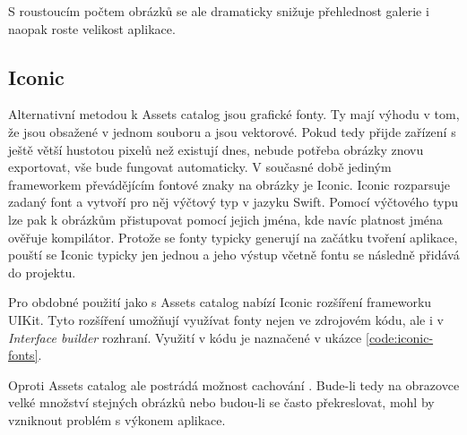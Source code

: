 S roustoucím počtem obrázků se ale dramaticky snižuje přehlednost galerie i naopak roste velikost aplikace.

\subsection{Iconic}

Alternativní metodou k Assets catalog jsou grafické fonty.
Ty mají výhodu v tom, že jsou obsažené v jednom souboru a jsou vektorové.
Pokud tedy přijde zařízení s ještě větší hustotou pixelů než existují dnes, nebude potřeba obrázky znovu exportovat, vše bude fungovat automaticky.
V současné době jediným frameworkem převádějícím fontové znaky na obrázky je Iconic.
Iconic rozparsuje zadaný font a vytvoří pro něj výčtový typ v jazyku Swift.
Pomocí výčtového typu lze pak k obrázkům přistupovat pomocí jejich jména, kde navíc platnost jména ověřuje kompilátor.
Protože se fonty typicky generují na začátku tvoření aplikace, pouští se Iconic typicky jen jednou a jeho výstup včetně fontu se následně přidává do projektu.

Pro obdobné použití jako s Assets catalog nabízí Iconic rozšíření frameworku UIKit.
Tyto rozšíření umožňují využívat fonty nejen ve zdrojovém kódu, ale i v \textit{Interface builder} rozhraní.
Využití v kódu je naznačené v ukázce \ref{code:iconic-fonts}.


Oproti Assets catalog ale postrádá možnost cachování \cite{github-iconic-cache}.
Bude-li tedy na obrazovce velké množství stejných obrázků nebo budou-li se často překreslovat, mohl by vzniknout problém s výkonem aplikace.
